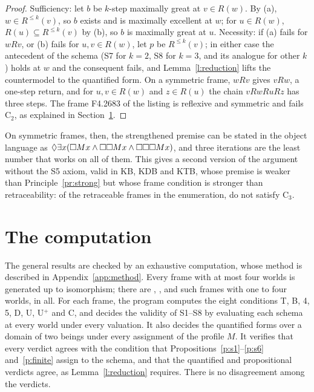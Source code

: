 \documentclass{situationist-preprint}
\begin{document}
\begin{proof}
Sufficiency: let $b$ be $k$-step maximally great at $v \in R(w)$. By (a), $w \in R^{\leq k}(v)$, so $b$ exists and is maximally excellent at $w$; for $u \in R(w)$, $R(u) \subseteq R^{\leq k}(v)$ by (b), so $b$ is maximally great at $u$. Necessity: if (a) fails for $wRv$, or (b) fails for $u, v \in R(w)$, let $p$ be $R^{\leq k}(v)$; in either case the antecedent of the schema (S7 for $k=2$, S8 for $k=3$, and its analogue for other $k$) holds at $w$ and the consequent fails, and Lemma~\ref{l:reduction} lifts the countermodel to the quantified form. On a symmetric frame, $wRv$ gives $vRw$, a one-step return, and for $u, v \in R(w)$ and $z \in R(u)$ the chain $v R w R u R z$ has three steps. The frame F4.2683 of the listing is reflexive and symmetric and fails C$_2$, as explained in Section~\ref{s:computation}.
\end{proof}

On symmetric frames, then, the strengthened premise can be stated in the object language as $\mathord{\Diamond}\exists x(\mathord{\Box} Mx \wedge \mathord{\Box}\mathord{\Box} Mx \wedge \mathord{\Box}\mathord{\Box}\mathord{\Box} Mx)$, and three iterations are the least number that works on all of them. This gives a second version of the argument without the S5 axiom, valid in KB, KDB and KTB, whose premise is weaker than Principle~\ref{pr:strong} but whose frame condition is stronger than retraceability: of the \stNumC{} retraceable frames in the enumeration, \stNumCnotSEight{} do not satisfy C$_3$.

\section{The computation}\label{s:computation}

The general results are checked by an exhaustive computation, whose method is described in Appendix~\ref{app:method}. Every frame with at most four worlds is generated up to isomorphism; there are \stNOne, \stNTwo, \stNThree{} and \stNFour{} such frames with one to four worlds, \stTotal{} in all. For each frame, the program computes the eight conditions T, B, 4, 5, D, U, U$^+$ and C, and decides the validity of S1--S8 by evaluating each schema at every world under every valuation. It also decides the quantified forms over a domain of two beings under every assignment of the profile $M$. It verifies that every verdict agrees with the condition that Propositions~\ref{p:s1}--\ref{p:s6} and~\ref{p:finite} assign to the schema, and that the quantified and propositional verdicts agree, as Lemma~\ref{l:reduction} requires. There is no disagreement among the \stChecks{} verdicts.
\end{document}
